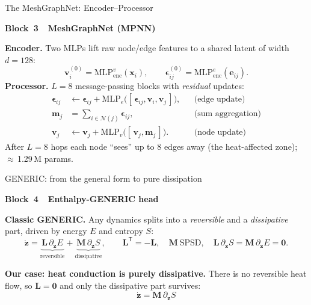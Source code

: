 \documentclass[aspectratio=169,11pt]{beamer}
\newcommand{\T}{\mathsf{T}}
\newcommand{\blocktag}[3]{\par\vspace{-3.5mm}\hfill
  {\footnotesize\setlength{\fboxsep}{2.2pt}%
   \colorbox{#1!16}{\textcolor{#1!60!black}{\textbf{Block~#2~\textbullet~#3}}}}%
  \par\vspace{0.3mm}}
\begin{document}
\begin{frame}{The MeshGraphNet: Encoder--Processor}
  \blocktag{nnblue}{3}{MeshGraphNet (MPNN)}
  \textbf{Encoder.} Two MLPs lift raw node/edge features to a shared latent of
  width $d{=}128$:
  \begin{equation*}
    \bm v_i^{(0)}=\mathrm{MLP}_{\mathrm{enc}}^{v}(\bm x_i),\qquad
    \bm\epsilon_{ij}^{(0)}=\mathrm{MLP}_{\mathrm{enc}}^{e}(\bm e_{ij}).
  \end{equation*}
  \pause
  \textbf{Processor.} $L{=}8$ message-passing blocks with \emph{residual} updates:
  \begin{align*}
    \bm\epsilon_{ij}&\leftarrow \bm\epsilon_{ij}
       +\mathrm{MLP}_e\big([\,\bm\epsilon_{ij},\bm v_i,\bm v_j\,]\big), &&\text{(edge update)}\\[-1pt]
    \bm m_j&=\textstyle\sum_{i\in\mathcal N(j)}\bm\epsilon_{ij}, &&\text{(sum aggregation)}\\[-1pt]
    \bm v_j&\leftarrow \bm v_j+\mathrm{MLP}_v\big([\,\bm v_j,\bm m_j\,]\big). &&\text{(node update)}
  \end{align*}
  \pause
  After $L{=}8$ hops each node ``sees'' up to 8 edges away (the heat-affected zone);
  $\approx$\,\num{1.29}\,M params. \quad{}
\end{frame}

\begin{frame}{GENERIC: from the general form to pure dissipation}
  \blocktag{orange!80!black}{4}{Enthalpy-GENERIC head}
  \textbf{Classic GENERIC.} Any dynamics splits into a \emph{reversible} and a
  \emph{dissipative} part, driven by energy $E$ and entropy $S$:
  \begin{equation*}
    \dot{\bm z}=\underbrace{\bm L\,\partial_{\bm z}E}_{\text{reversible}}
               +\underbrace{\bm M\,\partial_{\bm z}S}_{\text{dissipative}},
    \qquad \bm L^\T=-\bm L,\quad \bm M\ \text{SPSD},\quad
    \bm L\,\partial_{\bm z}S=\bm M\,\partial_{\bm z}E=\bm 0 .
  \end{equation*}
  \pause

  \textbf{Our case: heat conduction is purely dissipative.} There is no
  reversible heat flow, so $\bm L=\bm 0$ and only the dissipative part survives:
  \begin{equation*}
    \boxed{\;\dot{\bm z}=\bm M\,\partial_{\bm z}S\;}
  \end{equation*}
  \pause
  \centering
\end{frame}
\end{document}
